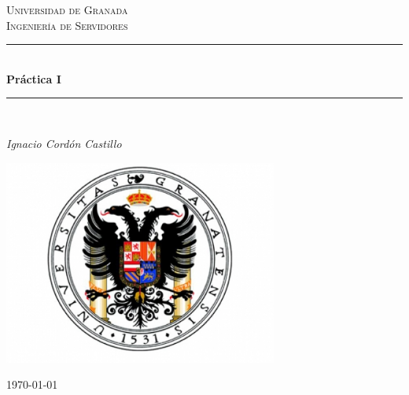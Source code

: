 \documentclass[a4paper,11pt]{article}
\begin{document}
\begin{titlepage}

\newcommand{\HRule}{\rule{\linewidth}{0.5mm}} %

\center %
 
\textsc{\LARGE Universidad de Granada}\\[1.5cm]
\textsc{\Large Ingeniería de Servidores}\\[0.5cm] 

\bigskip
\HRule \\[0.4cm]
{ \huge \bfseries Práctica I}\\[0.4cm] %
\HRule \\[1.5cm]
 

\begin{minipage}{0.4\textwidth}
\begin{center} \large
\emph{Ignacio Cordón Castillo}\\
\end{center}
\end{minipage}


\begin{center}
\includegraphics[width=9cm]{ugr.jpg}
\end{center}

\vspace{\fill}%
\large\today
\end{titlepage}  
\end{document}
